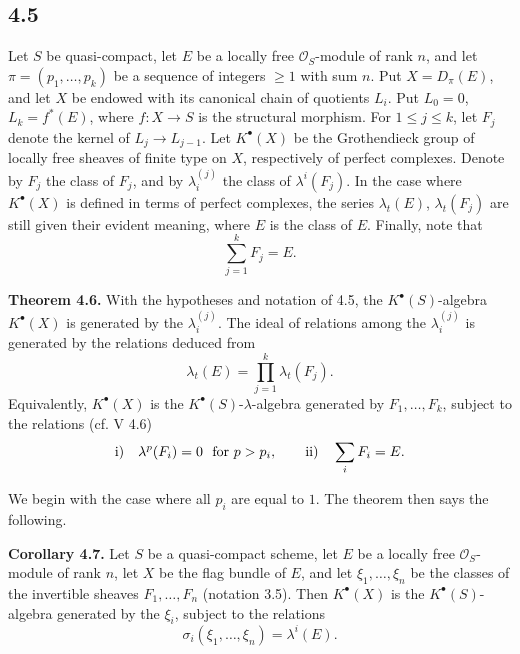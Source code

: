 \documentclass[11pt]{article}
\begin{document}
\subsection*{4.5}
Let \(S\) be quasi-compact, let \(E\) be a locally free \(\mathcal O_S\)-module of rank \(n\), and let \(\pi=(p_1,\ldots,p_k)\) be a sequence of integers \(\geq1\) with sum \(n\). Put \(X=D_\pi(E)\), and let \(X\) be endowed with its canonical chain of quotients \(L_i\). Put \(L_0=0\), \(L_k=f^*(E)\), where \(f:X\to S\) is the structural morphism. For \(1\leq j\leq k\), let \(F_j\) denote the kernel of \(L_j\to L_{j-1}\). Let \(K^\bullet(X)\) be the Grothendieck group of locally free sheaves of finite type on \(X\), respectively of perfect complexes. Denote by \(F_j\) the class of \(F_j\), and by \(\lambda_i^{(j)}\) the class of \(\lambda^i(F_j)\). In the case where \(K^\bullet(X)\) is defined in terms of perfect complexes, the series \(\lambda_t(E)\), \(\lambda_t(F_j)\) are still given their evident meaning, where \(E\) is the class of \(E\). Finally, note that
\[
  \sum_{j=1}^{k}F_j=E.
\]

\textbf{Theorem 4.6.} With the hypotheses and notation of 4.5, the \(K^\bullet(S)\)-algebra \(K^\bullet(X)\) is generated by the \(\lambda_i^{(j)}\). The ideal of relations among the \(\lambda_i^{(j)}\) is generated by the relations deduced from
\[
  \lambda_t(E)=\prod_{j=1}^{k}\lambda_t(F_j).
\]
Equivalently, \(K^\bullet(X)\) is the \(K^\bullet(S)\)-\(\lambda\)-algebra generated by \(F_1,\ldots,F_k\), subject to the relations (cf. V 4.6)
\[
  \text{\rm i)}\quad \lambda^p(F_i)=0\ \text{ for }p>p_i,
  \qquad
  \text{\rm ii)}\quad \sum_i F_i=E.
\]

We begin with the case where all \(p_i\) are equal to \(1\). The theorem then says the following.

\textbf{Corollary 4.7.} Let \(S\) be a quasi-compact scheme, let \(E\) be a locally free \(\mathcal O_S\)-module of rank \(n\), let \(X\) be the flag bundle of \(E\), and let \(\xi_1,\ldots,\xi_n\) be the classes of the invertible sheaves \(F_1,\ldots,F_n\) (notation 3.5). Then \(K^\bullet(X)\) is the \(K^\bullet(S)\)-algebra generated by the \(\xi_i\), subject to the relations
\[
  \sigma_i(\xi_1,\ldots,\xi_n)=\lambda^i(E).
\]
\end{document}
